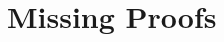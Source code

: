 \section{Missing Proofs}\label{sec:miss-proof}


\APPENDUNIQUEID

\APPENDLEMMUNIQUE

\APPENDLABELCONSISE

\APPENDSKETCHPROP

\APPENDCONNLABELSKETCH